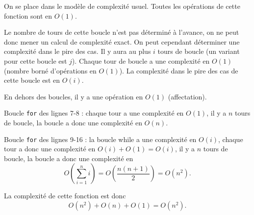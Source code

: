 \exer{}
\setcounter{numques}{0}

On se place dans le modèle de complexité usuel. 
Toutes les opérations de cette fonction sont en $O(1)$. 

\question{} Le nombre de tours de cette boucle n'est pas déterminé à l'avance, on ne peut donc mener un calcul de complexité exact. 
On peut cependant déterminer une complexité dans le pire des cas. 
Il y aura au plus $i$ tours de boucle (un variant pour cette boucle est $j$). 
Chaque tour de boucle a une complexité en $O(1)$ (nombre borné d'opérations en $O(1)$). 
La complexité dans le pire des cas de cette boucle est en $O(i)$. 

\question{} En dehors des boucles, il y a une opération en $O(1)$ (affectation). 

Boucle \texttt{for} des lignes 7-8 : chaque tour a une complexité en $O(1)$, il y a $n$ tours de boucle, la boucle a donc une complexité en $O(n)$. 

Boucle \texttt{for} des lignes 9-16 : la boucle while a une complexité en $O(i)$, chaque tour a donc une complexité en $O(i)+O(1)=O(i)$, il y a $n$ tours de boucle, la boucle a donc une complexité en 
\begin{equation*}
    O\left(\sum_{i=1}^n i\right) = O\left(\dfrac{n(n+1)}{2}\right) = O(n^2).
\end{equation*}

La complexité de cette fonction est donc 
\begin{equation*}
    O(n^2)+O(n)+O(1) = O(n^2).
\end{equation*}
